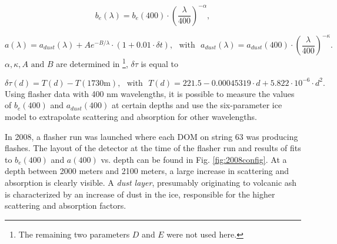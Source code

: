 \begin{equation}
b_e(\lambda)  = b_e(400) \cdot \left( \frac{\lambda}{400}\right)^{-\alpha},
\end{equation}

\begin{equation}
a(\lambda) = a_{dust}(\lambda) + A e^{-B/\lambda} \cdot (1+0.01 \cdot \delta t), \ \ \ \textrm{with} \ \ \ a_{dust}(\lambda) = a_{dust}(400) \cdot \left( \frac{\lambda}{400}\right)^{-\kappa}.
\end{equation}
$\alpha, \kappa, A \textrm{ and } B$ are determined in \cite{Ackermann:2006pva}\footnote{The remaining two parameters $D$ and $E$ were not used here.}, $\delta \tau$ is equal to

\begin{equation}
\delta \tau(d) = T(d) - T(1730 \textrm{m}), \ \ \ \textrm{with} \ \ \ T(d) = 221.5 - 0.00045319 \cdot d + 5.822 \cdot 10^{-6} \cdot d^2.
\end{equation}
Using flasher data with 400 nm wavelengths, it is possible to measure the values of $b_e(400)$ and $a_{dust}(400)$ at certain depths and use the six-parameter ice model to extrapolate scattering and absorption for other wavelengths. 

In 2008, a flasher run was launched where each DOM on string 63 was producing flashes. The layout of the detector at the time of the flasher run and results of fits to $b_{e}(400)$ and $a(400)$ vs. depth can be found in Fig. \ref{fig:2008config}. At a depth between 2000 meters and 2100 meters, a large increase in scattering and absorption is clearly visible. A \textit{dust layer}, presumably originating to volcanic ash is characterized by an increase of dust in the ice, responsible for the higher scattering and absorption factors.

